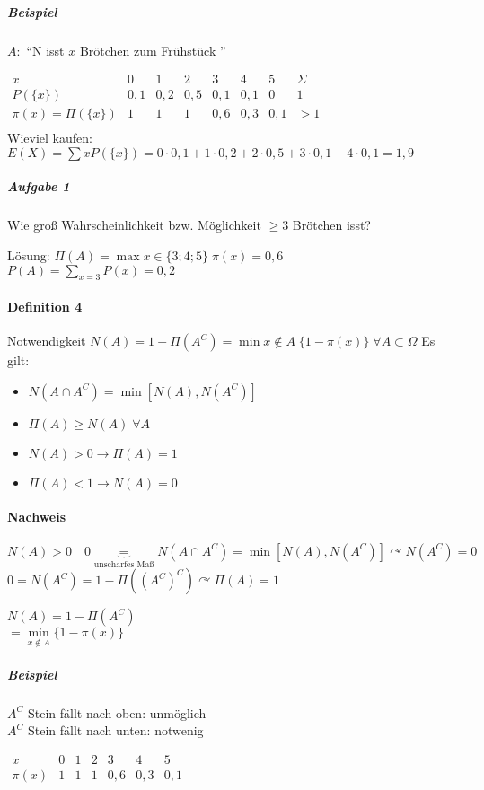 \documentclass[a4paper]{scrartcl}
\begin{document}
\subparagraph{Beispiel} $A:$ "`N isst $x$ Brötchen zum Frühstück "'

$\begin{array}{c|ccccccc}
x & 0 & 1 & 2 & 3 & 4 & 5 & \Sigma \\ \hline
P(\{x\}) & 0,1 & 0,2 & 0,5 & 0,1 & 0,1 & 0 & 1 \\
\pi (x) = \Pi (\{x\}) & 1 & 1 & 1 & 0,6 & 0,3 & 0,1 & > 1\\
\end{array}$\\
Wieviel kaufen: $E(X) = \sum x P(\{x \}) = 0 \cdot 0,1 + 1 \cdot 0,2 + 2 \cdot 0,5 + 3 \cdot 0,1 + 4 \cdot 0,1 = 1,9$

\subparagraph{Aufgabe 1} Wie groß Wahrscheinlichkeit  bzw. Möglichkeit $\geq 3$ Brötchen isst?

Lösung: $\Pi (A) = \max x \in \{3;4;5\} \; \pi (x) = 0,6$\\
$P(A) = \sum\limits_{x=3} P(x) = 0,2$

\paragraph{Definition 4} Notwendigkeit $N(A) = 1- \Pi (A^C) = \min x \notin A \; \{ 1- \pi (x) \} \; \forall A \subset \Omega$
Es gilt:
\begin{itemize}
\item $N (A \cap A^C) = \min [N(A), N(A^C)]$
\item $\Pi (A) \geq N(A) \; \forall A$
\item $N(A) > 0 \rightarrow \Pi (A) = 1 $
\item $\Pi (A) < 1 \rightarrow N(A) = 0$
\end{itemize}

\paragraph{Nachweis} $N(A) > 0 \quad 0 \underbrace{=}_{\text{unscharfes Maß}} N(A \cap A^C) = \min [ N(A), N(A^C)] \curvearrowright N(A^C) = 0$\\
$0 = N(A^C) = 1 - \Pi((A^C)^C) \curvearrowright \Pi (A) = 1$

$N(A) = 1- \Pi (A^C)$\\
$= \min\limits_{x \notin A} \{1- \pi (x)\} $
\subparagraph{Beispiel} $A^C$ Stein fällt nach oben: unmöglich\\
$A^C$ Stein fällt nach unten: notwenig

$\begin{array}{c|c|c|c|c|c|c}
x & 0 & 1 & 2 & 3 & 4 & 5 \\ \hline
\pi (x) & 1 & 1 & 1 & 0,6 & 0,3 & 0,1\\
\end{array}$
\end{document}
